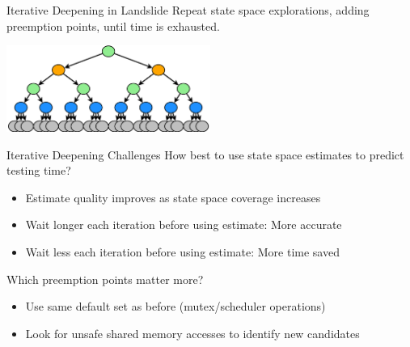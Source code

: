 \documentclass[xcolor=dvipsnames]{beamer}
\begin{document}
\begin{frame}{Iterative Deepening in Landslide}
	Repeat state space explorations, adding preemption points, until time is exhausted.
	\begin{center}
		\includegraphics[width=0.5\textwidth]{tree3.pdf}
	\end{center}
\end{frame}
\begin{frame}{Iterative Deepening Challenges}
	How best to use state space estimates to predict testing time?
	\begin{itemize}
		\item Estimate quality improves as state space coverage increases
		\item Wait longer each iteration before using estimate: More accurate
		\item Wait less each iteration before using estimate: More time saved
	\end{itemize}
	\pause
	\linegap

	Which preemption points matter more? %
	\begin{itemize}
		\item Use same default set as before (mutex/scheduler operations)
		\item Look for unsafe shared memory accesses to identify new candidates
	\end{itemize}
\end{frame}
\end{document}
